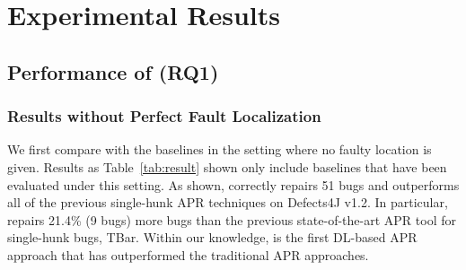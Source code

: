 \begin{table}
\caption{Comparison with Perfect Fault Localization}\vspace{-2mm}
\label{tab:result2}
\end{table}

\section{Experimental Results}
\subsection{Performance of \techname(RQ1)}
\subsubsection{Results without Perfect Fault Localization}
We first compare \techname with the baselines in the setting where no faulty location is given. Results as Table~\ref{tab:result} shown only include baselines that have been evaluated under this setting. As shown, \techname correctly repairs 51 bugs and outperforms all of the previous single-hunk APR techniques on Defects4J v1.2. In particular, \techname repairs 21.4\% (9 bugs) more bugs than the previous state-of-the-art APR tool for single-hunk bugs, TBar. Within our knowledge, \techname is the first DL-based APR approach that has outperformed the traditional APR approaches. 


